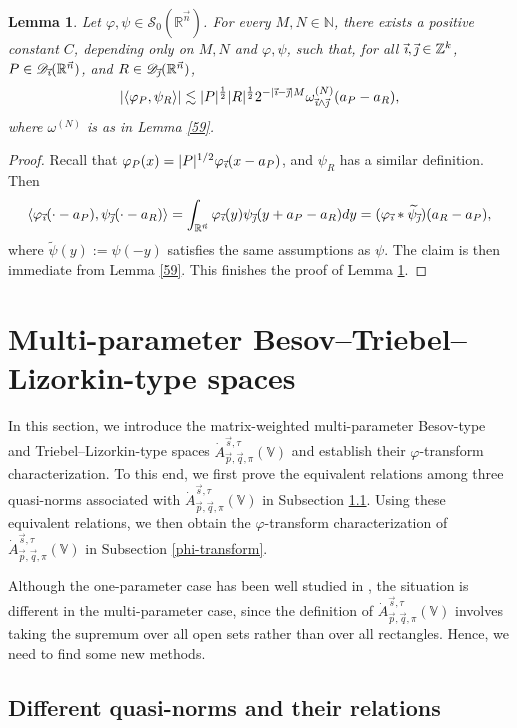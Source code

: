 \documentclass[11pt, reqno]{amsart}
\newtheorem{lemma}[theorem]{Lemma}
\theoremstyle{definition}
\theoremstyle{remark}
\numberwithin{equation}{section}
\newcommand{\D}{\mathscr D}
\newcommand{\R}{\mathbb R}
\newcommand{\Sc}{\mathscr S}
\newcommand{\Z}{\mathbb Z}
\newcommand{\vi}{\vec{\textit{\i}}}
\newcommand{\vj}{\vec{\textit{\j}}}
\newcommand{\vn}{\vec n}
\newcommand{\vp}{\vec p}
\newcommand{\vq}{\vec q}
\newcommand{\vs}{\vec s}
\newcommand{\Atau}{\dot A^{\vs,\tau}_{\vp,\vq,\pi}}
\newcommand{\pair}[2]{\langle #1, #2 \rangle}
\newcommand{\abs}[1]{|#1|}
\begin{document}
\begin{lemma}\label{59x}
Let $\varphi,\psi\in\Sc_0(\R^{\vn})$.
For every $M,N\in\mathbb{N}$, there exists a positive constant $C$,
depending only on $M,N$ and $\varphi,\psi$, such that,
for all $\vi,\vj\in\Z^k$, $P\in\D_{\vi}(\R^{\vn})$, and $R\in\D_{\vj}(\R^{\vn})$,
\begin{equation*}
\abs{\pair{\varphi_P}{\psi_R}}
\lesssim\abs{P}^{\frac 12} \abs{R}^{\frac 12}
2^{-\abs{\vi-\vj}M} \omega_{\vi\wedge\vj}^{(N)}(a_P-a_R),
\end{equation*}
where $\omega^{(N)}$ is as in Lemma \ref{59}.
\end{lemma}

\begin{proof}
Recall that $\varphi_P(x)=\abs{P}^{1/2}\varphi_{\vi}(x-a_P)$, and $\psi_R$ has a similar definition. Then
\begin{equation*}
\pair{\varphi_{\vi}(\cdot-a_P)}{\psi_{\vj}(\cdot-a_R)}
=\int_{\R^{\vn}}\varphi_{\vi}(y)\psi_{\vj}(y+a_P-a_R)dy
=(\varphi_{\vi}*\widetilde\psi_{\vj})(a_R-a_P),
\end{equation*}
where $\widetilde\psi(y):=\psi(-y)$ satisfies the same assumptions as $\psi$. The claim is then immediate from Lemma \ref{59}.
This finishes the proof of Lemma \ref{59x}.
\end{proof}

\section{Multi-parameter Besov--Triebel--Lizorkin-type spaces}
\label{BF type spaces}

In this section, we introduce the matrix-weighted
multi-parameter Besov-type and Triebel--Lizorkin-type spaces $\Atau(\mathbb V)$
and establish their $\varphi$-transform characterization.
To this end, we first prove the equivalent relations among three quasi-norms
associated with $\Atau(\mathbb V)$ in Subsection \ref{W and AQ 1}.
Using these equivalent relations, we then obtain the
$\varphi$-transform characterization of $\Atau(\mathbb V)$ in Subsection \ref{phi-transform}.

Although the one-parameter case has been well studied in \cite{BHYY:1a},
the situation is different in the multi-parameter case,
since the definition of $\Atau(\mathbb V)$ involves
taking the supremum over all open sets rather than over all rectangles.
Hence, we need to find some new methods.

\subsection{Different quasi-norms and their relations}
\label{W and AQ 1}
\end{document}
